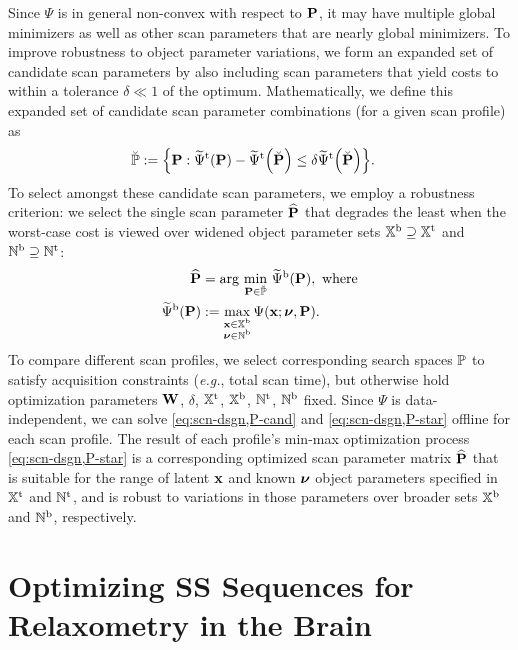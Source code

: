 Since $\Psi$ is in general non-convex 
with respect to $\mathbf{P}$, 
it may have multiple global minimizers 
as well as other scan parameters 
that are nearly global minimizers. 
To improve robustness 
to object parameter variations, 
we form an expanded set of candidate scan parameters 
by also including scan parameters 
that yield costs to within a tolerance $\delta \ll 1$ 
of the optimum. 
Mathematically, 
we define this expanded set 
of candidate scan parameter combinations 
(for a given scan profile) as 
\begin{align}
	\setPc &:= 
		\set{\bmP : \costawt{\bmP} - \costawt{\bmPc} \le \delta \costawt{\bmPc}}.
		\label{eq:scn-dsgn,set}
\end{align}
To select amongst these candidate scan parameters, 
we employ a robustness criterion: 
we select the single scan parameter $\widehat{\mathbf{P}}$ 
that degrades the least 
when the worst-case cost is viewed 
over widened object parameter sets 
$\mathbb{X}^\mathrm{b} \supseteq \mathbb{X}^\mathrm{t}$ and $\mathbb{N}^\mathrm{b} \supseteq \mathbb{N}^\mathrm{t}$:
\begin{align}
	\bmPs &= 
		\argmin{\bmP \in \setPc} \costawb{\bmP}, \where
		\label{eq:scn-dsgn,P-star} \\
	\costawb{\bmP} &:=
		\max_{\substack{\bmx \in \setXb \\ \bmnu \in \setNb}}
		\costa{\bmx; \bmnu, \bmP}.
		\label{eq:scn-dsgn,cost-broad}
\end{align}
To compare different scan profiles, 
we select corresponding search spaces $\mathbb{P}$ 
to satisfy acquisition constraints 
(\emph{e.g.}, total scan time), 
but otherwise hold optimization parameters 
$\mathbf{W}$, $\delta$, $\mathbb{X}^\mathrm{t}$, $\mathbb{X}^\mathrm{b}$, $\mathbb{N}^\mathrm{t}$, $\mathbb{N}^\mathrm{b}$ fixed.
Since $\Psi$ is data-independent, 
we can solve \eqref{eq:scn-dsgn,P-cand} and \eqref{eq:scn-dsgn,P-star} offline 
for each scan profile. 
The result of each profile's min-max optimization process \eqref{eq:scn-dsgn,P-star} 
is a corresponding optimized scan parameter matrix $\widehat{\mathbf{P}}$ 
that is suitable for the range 
of latent $\mathbf{x}$ and known $\boldsymbol{\nu}$ object parameters specified 
in $\mathbb{X}^\mathrm{t}$ and $\mathbb{N}^\mathrm{t}$, 
and is robust to variations in those parameters 
over broader sets $\mathbb{X}^\mathrm{b}$ and $\mathbb{N}^\mathrm{b}$, 
respectively.

\section{Optimizing SS Sequences for Relaxometry in the Brain}
\label{s,scn-dsgn,opt}

